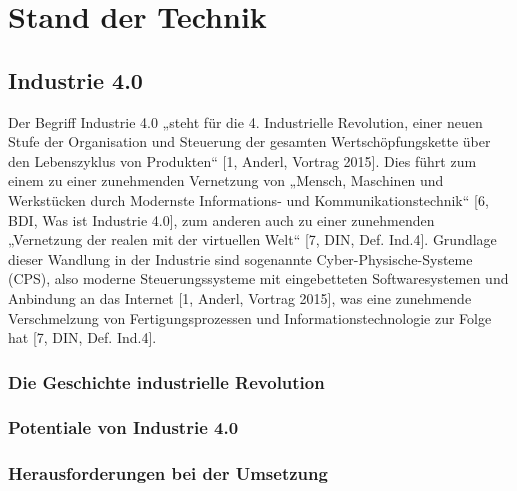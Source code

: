 \chapter{Stand der Technik}\label{cha:StandDerTechnik}

\lipsum[2]

\section{Industrie 4.0}\label{sec:Industrie4.0}
Der Begriff Industrie 4.0 „steht für die 4. Industrielle Revolution, einer neuen Stufe der Organisation und Steuerung der gesamten Wertschöpfungskette über den Lebenszyklus von Produkten“ [1, Anderl, Vortrag 2015]. Dies führt zum einem zu einer zunehmenden Vernetzung von „Mensch, Maschinen und Werkstücken durch Modernste Informations- und Kommunikationstechnik“ [6, BDI, Was ist Industrie 4.0], zum anderen auch zu einer zunehmenden „Vernetzung der realen mit der virtuellen Welt“ [7, DIN, Def. Ind.4].
\newline
Grundlage dieser Wandlung in der Industrie sind sogenannte Cyber-Physische-Systeme (CPS), also moderne Steuerungssysteme mit eingebetteten Softwaresystemen und Anbindung an das Internet [1, Anderl, Vortrag 2015], was eine zunehmende Verschmelzung von Fertigungsprozessen und Informationstechnologie zur Folge hat [7, DIN, Def. Ind.4].
\newline

\lipsum[2]

\subsection{Die Geschichte industrielle Revolution}\label{sec:IndustrielleRevolution}

\lipsum[2]

\subsection{Potentiale von Industrie 4.0}\label{sec:PotentialeIndustrie4.0}

\lipsum[2]

\subsection{Herausforderungen bei der Umsetzung}\label{sec:HerausforderungenUmsetzung}

